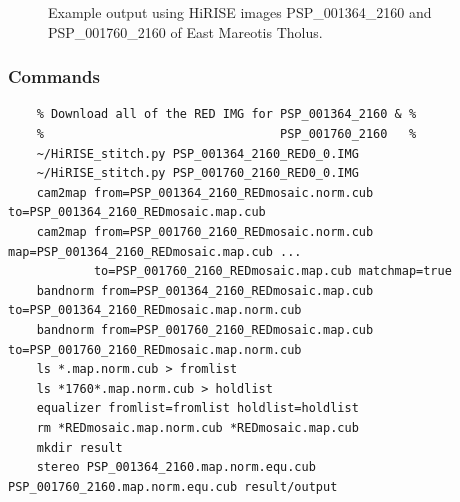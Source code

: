 \begin{figure}[h!]
\centering
  \hfil
\caption{Example output using HiRISE images PSP\_001364\_2160 and
  PSP\_001760\_2160 of East Mareotis Tholus.}
\label{fig:hirise_emare_example}
\end{figure}

\subsubsection*{Commands}

\begin{verbatim}
    % Download all of the RED IMG for PSP_001364_2160 & %
    %                                 PSP_001760_2160   %
    ~/HiRISE_stitch.py PSP_001364_2160_RED0_0.IMG
    ~/HiRISE_stitch.py PSP_001760_2160_RED0_0.IMG
    cam2map from=PSP_001364_2160_REDmosaic.norm.cub to=PSP_001364_2160_REDmosaic.map.cub
    cam2map from=PSP_001760_2160_REDmosaic.norm.cub map=PSP_001364_2160_REDmosaic.map.cub ...
            to=PSP_001760_2160_REDmosaic.map.cub matchmap=true
    bandnorm from=PSP_001364_2160_REDmosaic.map.cub to=PSP_001364_2160_REDmosaic.map.norm.cub
    bandnorm from=PSP_001760_2160_REDmosaic.map.cub to=PSP_001760_2160_REDmosaic.map.norm.cub
    ls *.map.norm.cub > fromlist
    ls *1760*.map.norm.cub > holdlist
    equalizer fromlist=fromlist holdlist=holdlist
    rm *REDmosaic.map.norm.cub *REDmosaic.map.cub
    mkdir result
    stereo PSP_001364_2160.map.norm.equ.cub PSP_001760_2160.map.norm.equ.cub result/output
\end{verbatim}

